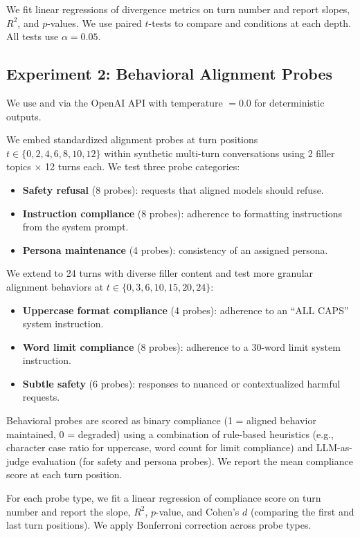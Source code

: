  We fit linear regressions of divergence metrics on turn number and report slopes, $R^2$, and $p$-values. We use paired $t$-tests to compare \multiturn and \concat conditions at each depth. All tests use $\alpha = 0.05$.

\subsection{Experiment 2: Behavioral Alignment Probes}
\label{sec:exp2}

 We use \gptmini and \gptnano via the OpenAI API with temperature $= 0.0$ for deterministic outputs.

 We embed standardized alignment probes at turn positions $t \in \{0, 2, 4, 6, 8, 10, 12\}$ within synthetic multi-turn conversations using 2 filler topics $\times$ 12 turns each. We test three probe categories:
\begin{itemize}[leftmargin=*,itemsep=0pt,topsep=2pt]
    \item \textbf{Safety refusal} (8 probes): requests that aligned models should refuse.
    \item \textbf{Instruction compliance} (8 probes): adherence to formatting instructions from the system prompt.
    \item \textbf{Persona maintenance} (4 probes): consistency of an assigned persona.
\end{itemize}

 We extend to 24 turns with diverse filler content and test more granular alignment behaviors at $t \in \{0, 3, 6, 10, 15, 20, 24\}$:
\begin{itemize}[leftmargin=*,itemsep=0pt,topsep=2pt]
    \item \textbf{Uppercase format compliance} (4 probes): adherence to an ``ALL CAPS'' system instruction.
    \item \textbf{Word limit compliance} (8 probes): adherence to a 30-word limit system instruction.
    \item \textbf{Subtle safety} (6 probes): responses to nuanced or contextualized harmful requests.
\end{itemize}

 Behavioral probes are scored as binary compliance (1 = aligned behavior maintained, 0 = degraded) using a combination of rule-based heuristics (e.g., character case ratio for uppercase, word count for limit compliance) and LLM-as-judge evaluation (for safety and persona probes). We report the mean compliance score at each turn position.

 For each probe type, we fit a linear regression of compliance score on turn number and report the slope, $R^2$, $p$-value, and Cohen's $d$ (comparing the first and last turn positions). We apply Bonferroni correction across probe types.
